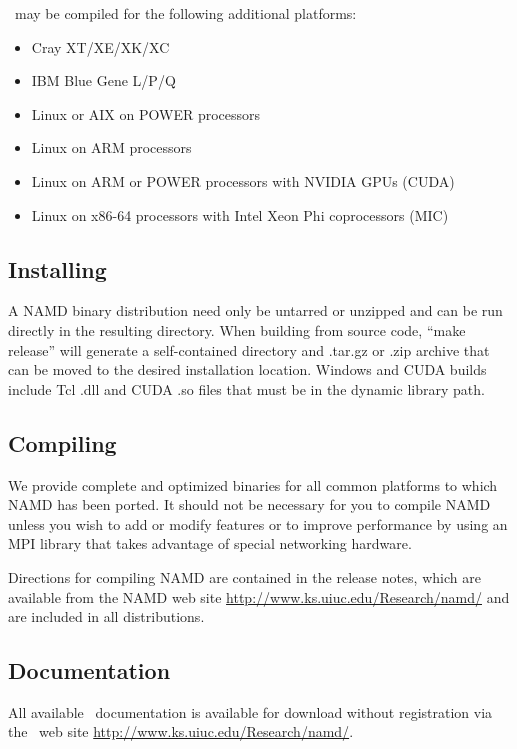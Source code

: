 \NAMD\ may be compiled for the following additional platforms:

\begin{itemize}
\item Cray XT/XE/XK/XC
\item IBM Blue Gene L/P/Q
\item Linux or AIX on POWER processors
\item Linux on ARM processors
\item Linux on ARM or POWER processors with NVIDIA GPUs (CUDA)
\item Linux on x86-64 processors with Intel Xeon Phi coprocessors (MIC)
\end{itemize}

\subsection{Installing \NAMD}

A NAMD binary distribution need only be untarred or unzipped and can
be run directly in the resulting directory.  When building from source
code, ``make release'' will generate a
self-contained directory and .tar.gz or .zip archive that can be moved
to the desired installation location.  Windows and CUDA builds include
Tcl .dll and CUDA .so files that must be in the dynamic library path.

\subsection{Compiling \NAMD}

We provide complete and optimized binaries for all
common platforms to which NAMD has been ported.
It should not be necessary for you to compile
NAMD unless you wish to add or modify features
or to improve performance by using an MPI library
that takes advantage of special networking hardware.

Directions for compiling NAMD are contained in the release notes,
which are available from the NAMD web site
\url{http://www.ks.uiuc.edu/Research/namd/}
and are included in all distributions.

\subsection{Documentation}

All available \NAMD\ documentation is available for download without
registration via the \NAMD\ web site
\url{http://www.ks.uiuc.edu/Research/namd/}.

